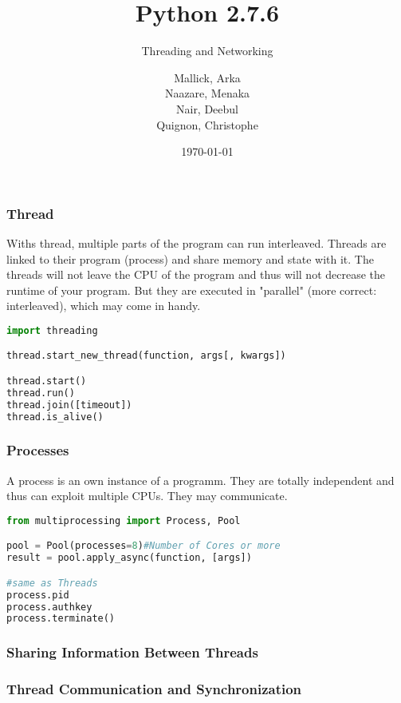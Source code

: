 \documentclass{beamer}
\begin{document}
\title{Python 2.7.6}
\subtitle{Threading and Networking}
\author{
  Mallick, Arka\\
  Naazare, Menaka \\
  Nair, Deebul\\
  Quignon, Christophe \\
} 
\date{\today}

\begin{frame}
\titlepage
\end{frame}

\begin{frame}[fragile]
\frametitle{Thread}
Withs thread, multiple parts of the program can run interleaved. Threads are linked to their program (process) and share memory and state with it.
The threads will not leave the CPU of the program and thus will not decrease the runtime of your program. But they are executed in "parallel" (more correct: interleaved), which may come in handy.


\begin{lstlisting}[language=Python]
import threading

thread.start_new_thread(function, args[, kwargs])

thread.start()
thread.run()
thread.join([timeout])
thread.is_alive()
\end{lstlisting}
\end{frame}

\begin{frame}[fragile]
\frametitle{Processes}
A process is an own instance of a programm. They are totally independent and thus can exploit multiple CPUs. They may communicate. 

\begin{lstlisting}[language=Python]
from multiprocessing import Process, Pool

pool = Pool(processes=8)#Number of Cores or more
result = pool.apply_async(function, [args])

#same as Threads
process.pid
process.authkey
process.terminate()
\end{lstlisting}
\end{frame}


\begin{frame}[fragile]
\frametitle{Sharing Information Between Threads}

\end{frame}


\begin{frame}[fragile]
\frametitle{Thread Communication and Synchronization}

\end{frame}
\end{document}
